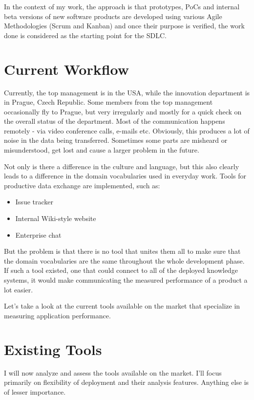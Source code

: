 In the context of my work, the approach is that prototypes, PoCs and internal beta versions of new software products are developed using various Agile Methodologies (Scrum and Kanban) and once their purpose is verified, the work done is considered as the starting point for the SDLC.

\section{Current Workflow}

Currently, the top management is in the USA, while the innovation department is in Prague, Czech Republic. Some members from the top management occasionally fly to Prague, but very irregularly and mostly for a quick check on the overall status of the department. Most of the communication happens remotely - via video conference calls, e-mails etc. Obviously, this produces a lot of noise in the data being transferred. Sometimes some parts are misheard or misunderstood, get lost and cause a larger problem in the future.

Not only is there a difference in the culture and language, but this also clearly leads to a difference in the domain vocabularies used in everyday work. Tools for productive data exchange are implemented, such as:

\begin{itemize}
	\item Issue tracker
	\item Internal Wiki-style website
	\item Enterprise chat
\end{itemize}

But the problem is that there is no tool that unites them all to make sure that the domain vocabularies are the same throughout the whole development phase. If such a tool existed, one that could connect to all of the deployed knowledge systems, it would make communicating the measured performance of a product a lot easier.

Let's take a look at the current tools available on the market that specialize in measuring application performance.

\section{Existing Tools}

I will now analyze and assess the tools available on the market. I'll focus primarily on flexibility of deployment and their analysis features. Anything else is of lesser importance.

